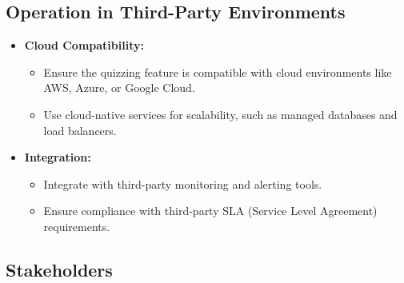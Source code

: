 \subsection{Operation in Third-Party Environments}

\begin{itemize}
    \item \textbf{Cloud Compatibility:}
          \begin{itemize}
              \item Ensure the quizzing feature is compatible with cloud environments like AWS, Azure, or Google Cloud.
              \item Use cloud-native services for scalability, such as managed databases and load balancers.
          \end{itemize}
    \item \textbf{Integration:}
          \begin{itemize}
              \item Integrate with third-party monitoring and alerting tools.
              \item Ensure compliance with third-party SLA (Service Level Agreement) requirements.
          \end{itemize}
\end{itemize}


\subsection{Stakeholders}

